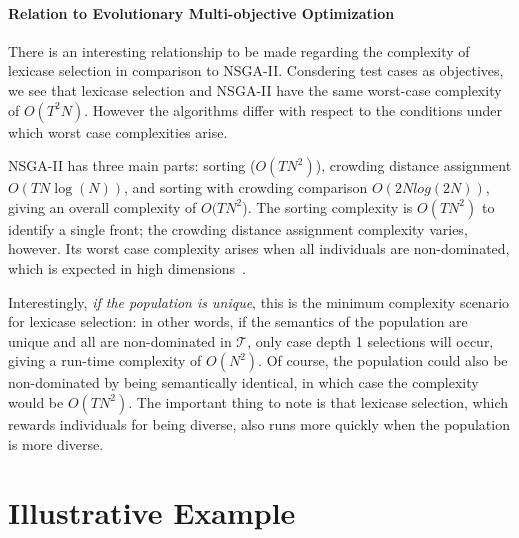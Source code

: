\documentclass[twoside]{article}
\begin{document}
\paragraph{Relation to Evolutionary Multi-objective Optimization}

There is an interesting relationship to be made regarding the complexity of lexicase selection in comparison to NSGA-II. Consdering test cases as objectives, we see that lexicase selection and NSGA-II have the same worst-case complexity of $O(T^2N)$. However the algorithms differ with respect to the conditions under which worst case complexities arise. 

NSGA-II has three main parts: sorting ($O(TN^2)$), crowding distance assignment $O(TN \log(N))$, and sorting with crowding comparison $O(2Nlog(2N))$, giving an overall complexity of $O(TN^2$). The sorting complexity is $O(TN^2)$ to identify a single front; the crowding distance assignment complexity varies, however. Its worst case complexity arises when all individuals are non-dominated, which is expected in high dimensions~\citep{farina_optimal_2002, wagner_pareto-_2007}. 

Interestingly, {\it if the population is unique}, this is the minimum complexity scenario for lexicase selection: in other words, if the semantics of the population are unique and all are non-dominated in $\mathcal{T}$, only case depth 1 selections will occur, giving a run-time complexity of $O(N^2)$. Of course, the population could also be non-dominated by being semantically identical, in which case the complexity would be $O(TN^2)$. The important thing to note is that lexicase selection, which rewards individuals for being diverse, also runs more quickly when the population is more diverse. 


\section{Illustrative Example}\label{s:ex}
\end{document}
